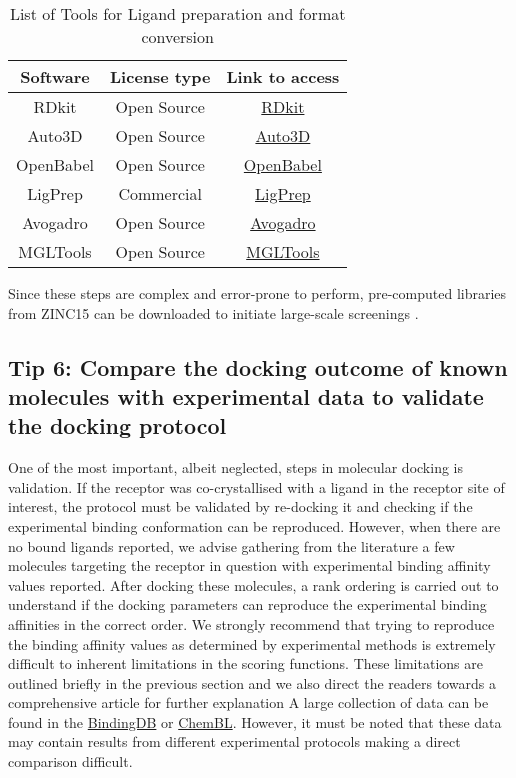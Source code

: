 \documentclass[10pt,letterpaper]{article}
\begin{document}
{{\begin{table}[ht]
    \centering
    \caption{List of Tools for Ligand preparation and format conversion}
    \label{tab:list2}
    \begin{tabular}{|c|c|c|}
    \hline
         \textbf{Software} & \textbf{License type} & \textbf{Link to access} \\
    \hline
        RDkit & Open Source & \href{https://github.com/rdkit/rdkit}{RDkit} \\
        Auto3D & Open Source & \href{https://github.com/isayevlab/Auto3D_pkg}{Auto3D}  \\
        OpenBabel & Open Source & \href{https://github.com/openbabel/openbabel}{OpenBabel}  \\
        LigPrep & Commercial & \href{https://www.schrodinger.com/platform/products/ligprep/}{LigPrep} \\
        Avogadro & Open Source & \href{https://avogadro.cc/}{Avogadro}  \\
        MGLTools & Open Source & \href{https://ccsb.scripps.edu/mgltools/downloads/}{MGLTools} \\
    \hline
    \end{tabular}
\end{table}

Since these steps are complex and error-prone to perform, pre-computed libraries from ZINC15 can be downloaded to initiate large-scale screenings \cite{bib76}.

\subsection*{Tip 6: Compare the docking outcome of known molecules with experimental data to validate the docking protocol}
One of the most important, albeit neglected, steps in molecular docking is validation. If the receptor was co-crystallised with a ligand in the receptor site of interest, the protocol must be validated by re-docking it and checking if the experimental binding conformation can be reproduced. However, when there are no bound ligands reported, we advise gathering from the literature a few molecules targeting the receptor in question with experimental binding affinity values reported. After docking these molecules, a rank ordering is carried out to understand if the docking parameters can reproduce the experimental binding affinities in the correct order. We strongly recommend that trying to reproduce the binding affinity values as determined by experimental methods is extremely difficult to inherent limitations in the scoring functions. These limitations are outlined briefly in the previous section and we also direct the readers towards a comprehensive article for further explanation\cite{bib54} A large collection of data can be found in the \href{https://www.bindingdb.org/rwd/bind/index.jsp}{BindingDB} or  \href{https://www.ebi.ac.uk/chembl/}{ChemBL}. However, it must be noted that these data may contain results from different experimental protocols making a direct comparison difficult.

}}
\end{document}
